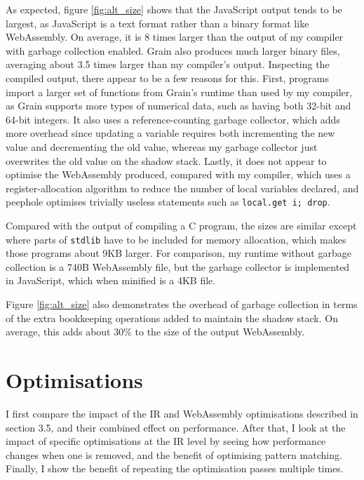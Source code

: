 As expected, figure \ref{fig:alt_size} shows that the JavaScript output tends to be largest, as JavaScript is a text format rather than a binary format like WebAssembly. On average, it is 8 times larger than the output of my compiler with garbage collection enabled. Grain also produces much larger binary files, averaging about 3.5 times larger than my compiler's output. Inspecting the compiled output, there appear to be a few reasons for this. First, programs import a larger set of functions from Grain's runtime than used by my compiler, as Grain supports more types of numerical data, such as having both 32-bit and 64-bit integers. It also uses a reference-counting garbage collector, which adds more overhead since updating a variable requires both incrementing the new value and decrementing the old value, whereas my garbage collector just overwrites the old value on the shadow stack. Lastly, it does not appear to optimise the WebAssembly produced, compared with my compiler, which uses a register-allocation algorithm to reduce the number of local variables declared, and peephole optimises trivially useless statements such as \verb|local.get i; drop|.

Compared with the output of compiling a C program, the sizes are similar except where parts of \verb|stdlib| have to be included for memory allocation, which makes those programs about 9KB larger. For comparison, my runtime without garbage collection is a 740B WebAssembly file, but the garbage collector is implemented in JavaScript, which when minified is a 4KB file.

Figure \ref{fig:alt_size} also demonstrates the overhead of garbage collection in terms of the extra bookkeeping operations added to maintain the shadow stack. %
On average, this adds about 30\% to the size of the output WebAssembly. %

\section{Optimisations}

I first compare the impact of the IR and WebAssembly optimisations described in section 3.5, and their combined effect on performance. After that, I look at the impact of specific optimisations at the IR level by seeing how performance changes when one is removed, and the benefit of optimising pattern matching. Finally, I show the benefit of repeating the optimisation passes multiple times. %

